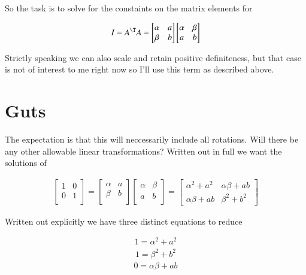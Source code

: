 So the task is to solve for the constaints on the matrix elements for

\begin{align}\label{eqn:quadratricForm:voo4}
I = A^\T A = 
\begin{bmatrix}
\alpha & a     \\
\beta  & b \\
\end{bmatrix}
\begin{bmatrix}
\alpha & \beta \\
a      & b \\
\end{bmatrix}
\end{align}

Strictly speaking we can also scale and retain positive definiteness, but that case is not of interest to me right now so I'll use this term as described above.

\section{Guts}

The expectation is that this will neccessarily include all rotations.  Will there be any other allowable linear transformations?  Written out in full we want the solutions of 

\begin{align}\label{eqn:quadratricForm:voo5a}
\begin{bmatrix}
1 & 0 \\
0 & 1 \\
\end{bmatrix}
=
\begin{bmatrix}
\alpha & a     \\
\beta  & b \\
\end{bmatrix}
\begin{bmatrix}
\alpha & \beta \\
a      & b \\
\end{bmatrix}
= 
\begin{bmatrix}
\alpha^2 + a^2 & \alpha \beta + a b \\
\alpha \beta + a b & \beta^2 + b^2
\end{bmatrix}
\end{align}

Written out explicitly we have three distinct equations to reduce

\begin{align}\label{eqn:quadratricForm:voo5}
1 = \alpha^2 + a^2 
\end{align}
\begin{align}\label{eqn:quadratricForm:voo6}
1 = \beta^2 + b^2 
\end{align}
\begin{align}\label{eqn:quadratricForm:voo7}
0 = \alpha \beta + a b 
\end{align}

